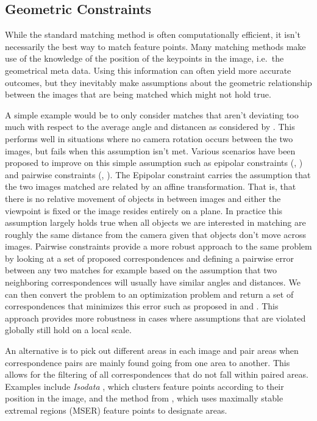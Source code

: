 \subsection{Geometric Constraints}

While the standard matching method is often computationally efficient, 
it isn't necessarily the best way to match feature points. Many matching 
methods make use of the knowledge of the position of the keypoints in 
the image, i.e.\ the geometrical meta data. Using this information can 
often yield more accurate outcomes, but they inevitably make assumptions
about the geometric relationship between the images that are being 
matched which might not hold true.  

A simple example would be to only consider matches that aren't deviating 
too much with respect to the average angle and distancen as considered 
by \cite{kim2008efficient}.  This performs well in situations where no 
camera rotation occurs between the two images, but fails when this 
assumption isn't met. Various scenarios have been proposed to improve on 
this simple assumption such as epipolar constraints 
(\cite{torr2000mlesac}, \cite{chum2005matching}) and pairwise 
constraints (\cite{choi2009robust}, \cite{leordeanu2005spectral}). The 
Epipolar constraint carries the assumption that the two images matched 
are related by an affine transformation. That is, that there is no 
relative movement of objects in between images and either the viewpoint 
is fixed or the image resides entirely on a plane. In practice this 
assumption largely holds true when all objects we are interested in 
matching are roughly the same distance from the camera given that 
objects don't move across images.  Pairwise constraints provide a more 
robust approach to the same problem by looking at a set of proposed 
correspondences and defining a pairwise error between any two matches 
for example based on the assumption that two neighboring correspondences 
will usually have similar angles and distances. We can then convert the 
problem to an optimization problem and return a set of correspondences 
that minimizes this error such as proposed in \cite{choi2009robust} and 
\cite{leordeanu2005spectral}.  This approach provides more robustness in 
cases where assumptions that are violated globally still hold on a local 
scale.

An alternative is to pick out different areas in each image and pair 
areas when correspondence pairs are mainly found going from one area to 
another. This allows for the filtering of all correspondences that do 
not fall within paired areas. Examples include \emph{Isodata} 
\cite{das2008event}, which clusters feature points according to their 
position in the image, and the method from \cite{wu2011robust}, which 
uses maximally stable extremal regions (MSER) feature points to 
designate areas. 

